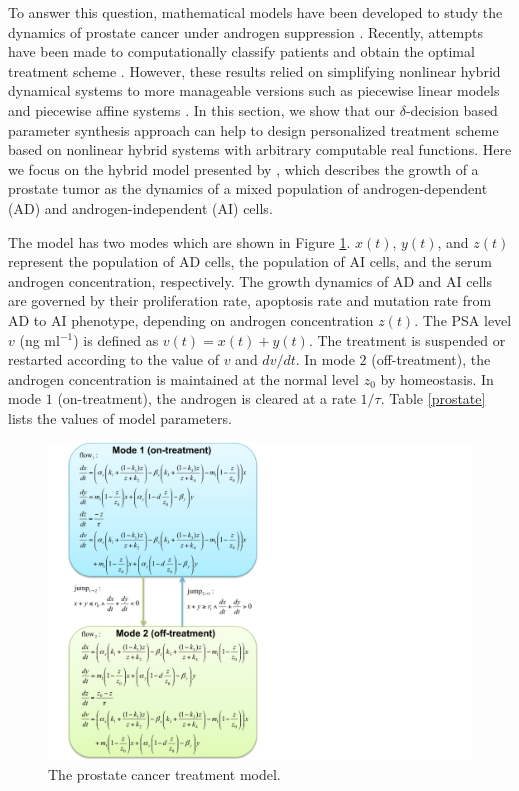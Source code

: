 To answer this question, mathematical models have been developed to study the dynamics of prostate cancer under androgen suppression \citep{jackson04,ideta08,hirata10,pnas11}. Recently, attempts have been made to computationally classify patients and obtain the optimal treatment scheme \citep{chaos10,suzuki10}. However, these results relied on simplifying nonlinear hybrid dynamical systems to more manageable versions such as piecewise linear models \citep{chaos10} and piecewise affine systems \citep{suzuki10}. In this section, we show that our $\delta$-decision based parameter synthesis approach can help to design personalized treatment scheme based on nonlinear hybrid systems with arbitrary computable real functions. Here we focus on the hybrid model presented by \cite{ideta08}, which describes the growth of a prostate tumor as the dynamics of a mixed population of androgen-dependent (AD) and androgen-independent (AI) cells.

The model has two modes which are shown in Figure \ref{pmodel}. $x(t)$, $y(t)$, and $z(t)$ represent the population of AD cells, the population of AI cells, and the serum androgen concentration, respectively. The growth dynamics of AD and AI cells are governed by their proliferation rate, apoptosis rate and mutation rate from AD to AI phenotype, depending on androgen concentration $z(t)$. The PSA level $v$ (ng ml$^{-1}$) is defined as $v(t)=x(t)+y(t)$. The treatment is suspended or restarted according to the value of $v$ and ${dv}/{dt}$. In mode $2$ (off-treatment), the androgen concentration is maintained at the normal level $z_0$ by homeostasis. In mode $1$ (on-treatment), the androgen is cleared at a rate $1/\tau$. Table \ref{prostate} lists the values of model parameters.

\begin{figure}[htb]
\centering
\includegraphics[scale=0.5]{fig-prostate}
\caption{The prostate cancer treatment model.}
\label{pmodel}
\end{figure}

